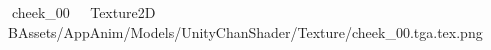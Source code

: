    cheek_00            	   Texture2D	   B   Assets/AppAnim/Models/UnityChanShader/Texture/cheek_00.tga.tex.png